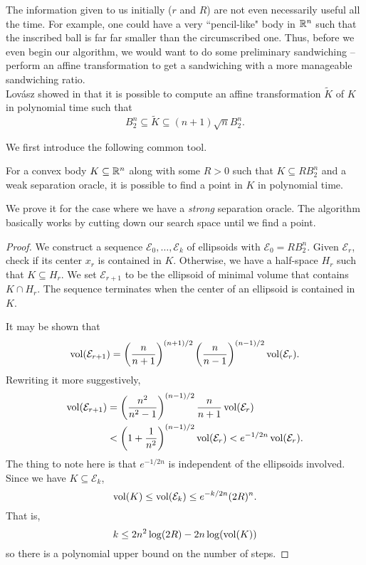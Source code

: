 The information given to us initially ($r$ and $R$) are not even necessarily useful all the time. For example, one could have a very ``pencil-like" body in $\mathbb{R}^n$ such that the inscribed ball is far far smaller than the circumscribed one. Thus, before we even begin our algorithm, we would want to do some preliminary sandwiching -- perform an affine transformation to get a sandwiching with a more manageable sandwiching ratio.\\

Lov\'asz showed in \cite{Lovsz1986AlgorithmicTO} that it is possible to compute an affine transformation $\tilde{K}$ of $K$ in polynomial time such that
\begin{equation}
\label{eqn weak lowner john ellipsoid}
	B_2^n\subseteq \tilde{K} \subseteq (n+1)\sqrt{n} B_2^n.
\end{equation}

We first introduce the following common tool.

\begin{lemma}
For a convex body $K\subseteq\mathbb{R}^n$ along with some $R>0$ such that $K\subseteq RB_2^n$ and a weak separation oracle, it is possible to find a point in $K$ in polynomial time.
\end{lemma}
	We prove it for the case where we have a \textit{strong} separation oracle. The algorithm basically works by cutting down our search space until we find a point.
\begin{proof}
	We construct a sequence $\mathcal{E}_0,\ldots,\mathcal{E}_k$ of ellipsoids with $\mathcal{E}_0 = R B_2^n$. Given $\mathcal{E}_r$, check if its center $x_r$ is contained in $K$. Otherwise, we have a half-space $H_r$ such that $K\subseteq H_r$. We set $\mathcal{E}_{r+1}$ to be the ellipsoid of minimal volume that contains $K\cap H_r$. The sequence terminates when the center of an ellipsoid is contained in $K$.

	It may be shown that
	\[ \operatorname{vol}(\mathcal{E}_{r+1}) = \left(\frac{n}{n+1}\right)^{(n+1)/2}\left(\frac{n}{n-1}\right)^{(n-1)/2} \operatorname{vol}(\mathcal{E}_{r}). \]
	Rewriting it more suggestively,
	\begin{align*}
		\operatorname{vol}(\mathcal{E}_{r+1}) &= \left(\frac{n^2}{n^2-1}\right)^{(n-1)/2} \frac{n}{n+1} \operatorname{vol}(\mathcal{E}_{r}) \\
		&< \left(1+\frac{1}{n^2}\right)^{(n-1)/2} \operatorname{vol}(\mathcal{E}_r) < e^{-1/2n} \operatorname{vol}(\mathcal{E}_r).
	\end{align*}
	The thing to note here is that $e^{-1/2n}$ is independent of the ellipsoids involved. Since we have $K\subseteq \mathcal{E}_k$,
	\[ \operatorname{vol} (K)\leq \operatorname{vol}(\mathcal{E}_k) \leq e^{-k/2n}(2R)^n.  \]
	That is,
	\[ k \leq 2n^2 \log(2R) - 2n \log(\operatorname{vol} (K)) \]
	so there is a polynomial upper bound on the number of steps.
\end{proof}

